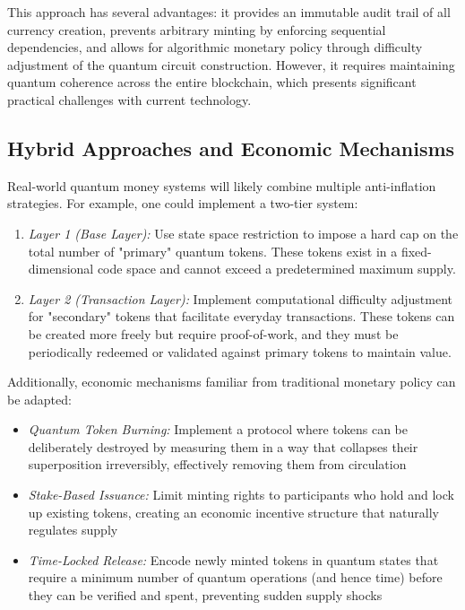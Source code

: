 \documentclass[a4paper,10.5pt,twoside]{article}
\begin{document}
This approach has several advantages: it provides an immutable audit trail of all currency creation, prevents arbitrary minting by enforcing sequential dependencies, and allows for algorithmic monetary policy through difficulty adjustment of the quantum circuit construction. However, it requires maintaining quantum coherence across the entire blockchain, which presents significant practical challenges with current technology.

\subsection{Hybrid Approaches and Economic Mechanisms}\label{s:3.4}
Real-world quantum money systems will likely combine multiple anti-inflation strategies. For example, one could implement a two-tier system:

\begin{enumerate}
\item \textit{Layer 1 (Base Layer):} Use state space restriction to impose a hard cap on the total number of "primary" quantum tokens. These tokens exist in a fixed-dimensional code space and cannot exceed a predetermined maximum supply.

\item \textit{Layer 2 (Transaction Layer):} Implement computational difficulty adjustment for "secondary" tokens that facilitate everyday transactions. These tokens can be created more freely but require proof-of-work, and they must be periodically redeemed or validated against primary tokens to maintain value.
\end{enumerate}

Additionally, economic mechanisms familiar from traditional monetary policy can be adapted:
\begin{itemize}
\item \textit{Quantum Token Burning:} Implement a protocol where tokens can be deliberately destroyed by measuring them in a way that collapses their superposition irreversibly, effectively removing them from circulation
\item \textit{Stake-Based Issuance:} Limit minting rights to participants who hold and lock up existing tokens, creating an economic incentive structure that naturally regulates supply
\item \textit{Time-Locked Release:} Encode newly minted tokens in quantum states that require a minimum number of quantum operations (and hence time) before they can be verified and spent, preventing sudden supply shocks
\end{itemize}
\end{document}
